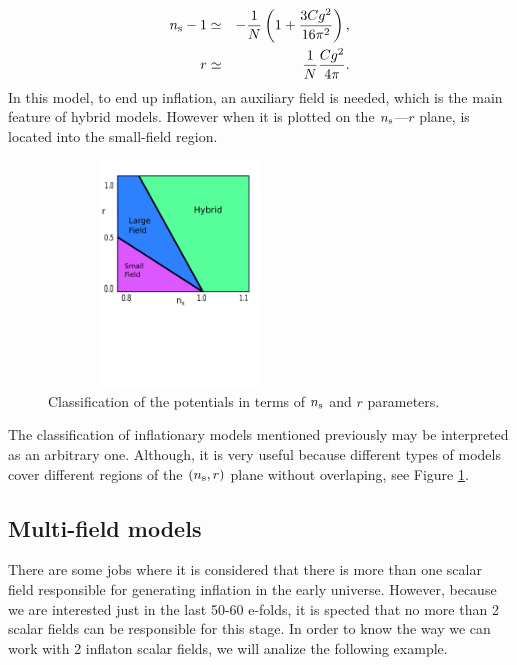 \documentclass{rmaa}
\def\bea{\begin{eqnarray}}
\def\eea{\end{eqnarray}}
\begin{document}
\bea
n_{\rm s}-1&\simeq& -\frac{1}{N}\left(1+\frac{3C g^2}{16 \pi^2}\right), \nonumber \\
r&\simeq& \frac{1}{N}{Cg^2\over 4\pi}.
 \eea
%
In this model, to end up inflation, an auxiliary field is needed, which is the main feature of
hybrid models. However when it is plotted on the $n_{\rm s}$---$r$ plane, is located into the
small-field region.
\\

\begin{figure}[h!]
\begin{center}
  \includegraphics[trim = 0mm 100mm 0mm 10mm, clip, width=7cm, height=6cm]{Zoo.pdf}
	\caption{Classification of the
potentials in terms of $n_{\rm s}$ and $r$ parameters. }
\label{fig:parameters}
\end{center}
\end{figure}

The classification of inflationary models mentioned previously may be interpreted as an 
arbitrary one. Although, it is very useful because different types of models cover different 
regions of the $(n_{\rm s}, r)$ plane without overlaping, see Figure \ref{fig:parameters}.

\subsection{Multi-field models}

There are some jobs where it is considered that there is more than one scalar field responsible for generating inflation in the early universe. However, because we are interested just in the last 50-60 e-folds, it is spected that no more than 2 scalar fields can be responsible for this stage. In order to know the way we can work with 2 inflaton scalar fields, we will analize the following example.
\end{document}
